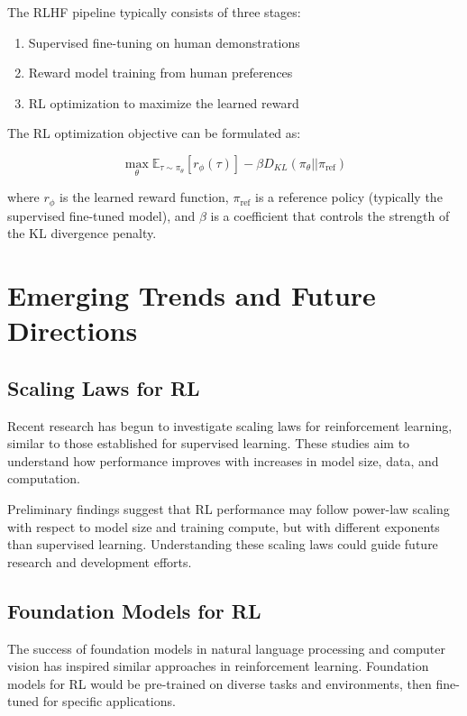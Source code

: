 \documentclass{article}
\begin{document}
The RLHF pipeline typically consists of three stages:
\begin{enumerate}
    \item Supervised fine-tuning on human demonstrations
    \item Reward model training from human preferences
    \item RL optimization to maximize the learned reward
\end{enumerate}

The RL optimization objective can be formulated as:

\begin{equation}
\max_{\theta} \mathbb{E}_{\tau \sim \pi_\theta} [r_\phi(\tau)] - \beta D_{KL}(\pi_\theta || \pi_{\text{ref}})
\end{equation}

where $r_\phi$ is the learned reward function, $\pi_{\text{ref}}$ is a reference policy (typically the supervised fine-tuned model), and $\beta$ is a coefficient that controls the strength of the KL divergence penalty.

\section{Emerging Trends and Future Directions}

\subsection{Scaling Laws for RL}

Recent research has begun to investigate scaling laws for reinforcement learning, similar to those established for supervised learning. These studies aim to understand how performance improves with increases in model size, data, and computation.

Preliminary findings suggest that RL performance may follow power-law scaling with respect to model size and training compute, but with different exponents than supervised learning. Understanding these scaling laws could guide future research and development efforts.

\subsection{Foundation Models for RL}

The success of foundation models in natural language processing and computer vision has inspired similar approaches in reinforcement learning. Foundation models for RL would be pre-trained on diverse tasks and environments, then fine-tuned for specific applications.
\end{document}
